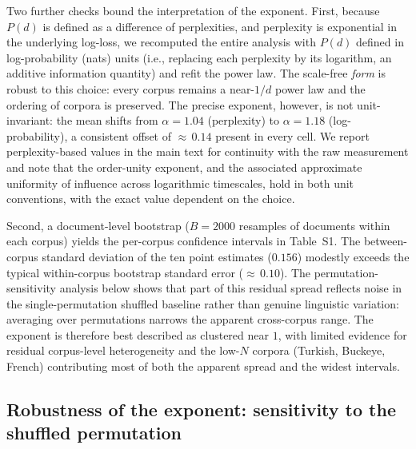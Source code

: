 \documentclass[11pt]{article}
\begin{document}
Two further checks bound the interpretation of the exponent. First, because $P(d)$ is defined as a
difference of perplexities, and perplexity is exponential in the underlying log-loss, we recomputed
the entire analysis with $P(d)$ defined in log-probability (nats) units (i.e., replacing each
perplexity by its logarithm, an additive information quantity) and refit the power law. The
scale-free \emph{form} is robust to this choice: every corpus remains a near-$1/d$ power law and the
ordering of corpora is preserved. The precise exponent, however, is not unit-invariant: the mean
shifts from $\alpha=1.04$ (perplexity) to $\alpha=1.18$ (log-probability), a consistent offset of ${\approx}\,0.14$
present in every cell. We report perplexity-based values in the main text for continuity with the raw
measurement and note that the order-unity exponent, and the associated approximate uniformity of
influence across logarithmic timescales, hold in both unit conventions, with the exact value
dependent on the choice.

Second, a document-level bootstrap ($B=2000$ resamples of documents within each corpus) yields the
per-corpus confidence intervals in Table~S1. The between-corpus standard deviation of the ten point
estimates ($0.156$) modestly exceeds the typical within-corpus bootstrap standard error
(${\approx}\,0.10$). The permutation-sensitivity analysis below shows that part of this residual
spread reflects noise in the single-permutation shuffled baseline rather than genuine linguistic
variation: averaging over permutations narrows the apparent cross-corpus range. The exponent is
therefore best described as clustered near $1$, with limited evidence for residual corpus-level
heterogeneity and the low-$N$ corpora (Turkish, Buckeye, French) contributing most of both the
apparent spread and the widest intervals.

\subsection*{Robustness of the exponent: sensitivity to the shuffled permutation}
\end{document}
